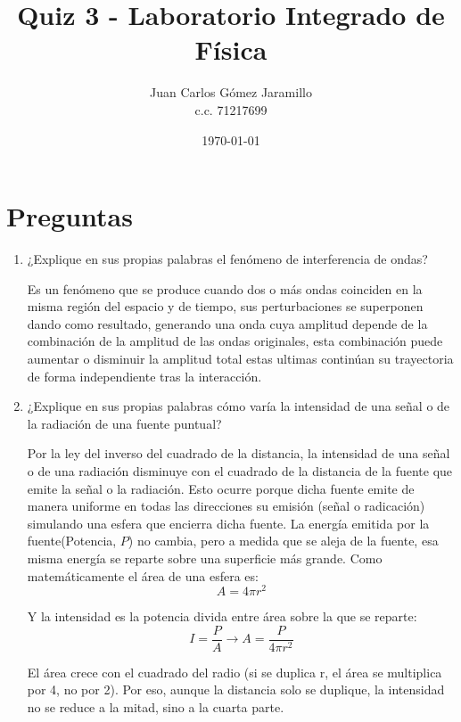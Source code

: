 \documentclass{article}
\title{Quiz 3 - Laboratorio Integrado de Física}
\author{Juan Carlos Gómez Jaramillo \\c.c. 71217699}
\date{\today}
\begin{document}
	
	\maketitle
	
	\section{Preguntas}
	\begin{enumerate}
		\item ¿Explique en sus propias palabras el fenómeno de interferencia de ondas? 
		
		\vspace{0.3cm}
		
		Es un fenómeno que se produce cuando dos o más ondas coinciden en la misma región del espacio y de tiempo, sus perturbaciones se superponen dando como resultado, generando una onda  cuya amplitud depende de la combinación de la amplitud de las ondas originales, esta combinación puede aumentar o disminuir la amplitud total estas ultimas continúan su trayectoria de forma independiente tras la interacción. 
		
		\vspace{0.3cm}
		
		\item ¿Explique en sus propias palabras cómo varía la intensidad de una señal o de la radiación de una fuente puntual?
		
		\vspace{0.3cm}
		
		Por la ley del inverso del cuadrado de la distancia, la intensidad de una señal o de una radiación disminuye con el cuadrado de la distancia de la fuente que emite la señal o la radiación. Esto ocurre porque dicha fuente emite de manera uniforme en todas las direcciones su emisión (señal o radicación) simulando una esfera que encierra dicha fuente. La energía emitida por la fuente(Potencia, $P$) no cambia, pero a medida que se aleja de la fuente, esa misma energía se reparte sobre una superficie más grande.
		Como matemáticamente el área de una esfera es:
		\[
		A=4\pi r^2
		\]
		
		Y la intensidad es la potencia divida entre área sobre la que se reparte:
		\[
		I=\frac{P}{A}
		\rightarrow
		A=\frac{P}{4\pi r^{2}}
		\]
		
		El área crece con el cuadrado del radio (si se duplica r, el área se multiplica por 4, no por 2). Por eso, aunque la distancia solo se duplique, la intensidad no se reduce a la mitad, sino a la cuarta parte.
		

\end{enumerate}
\end{document}
